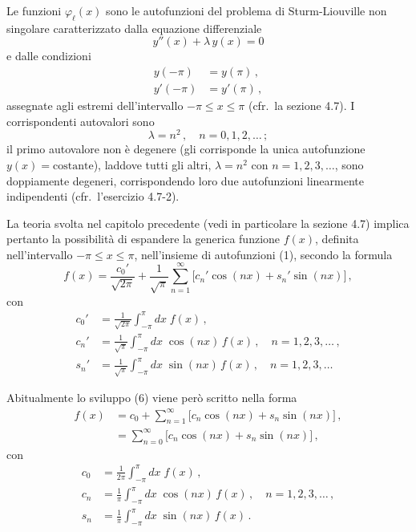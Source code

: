 \documentclass[11pt, a4paper]{book}
\numberwithin{equation}{section}
\begin{document}
Le funzioni $\varphi_\ell(x)$ sono le autofunzioni del problema di Sturm-Liouville non singolare caratterizzato dalla equazione differenziale
\begin{equation}
  y''(x) + \lambda\,y(x) = 0 \tag{3}
\end{equation}
e dalle condizioni
\begin{align}
  y(-\pi) &= y(\pi)\,, \tag{4a}\\
  y'(-\pi) &= y'(\pi)\,, \tag{4b}
\end{align}
assegnate agli estremi dell'intervallo $-\pi \leq x \leq \pi$ (cfr.\ la sezione 4.7). I corrispondenti autovalori sono
\begin{equation}
  \lambda = n^2\,,\quad n=0,1,2,\ldots\,; \tag{5}
\end{equation}
il primo autovalore non è degenere (gli corrisponde la unica autofunzione $y(x) = \text{costante}$), laddove tutti gli altri, $\lambda=n^2$ con $n=1,2,3,\ldots$, sono doppiamente degeneri, corrispondendo loro due autofunzioni linearmente indipendenti (cfr.\ l'esercizio 4.7-2).

La teoria svolta nel capitolo precedente (vedi in particolare la sezione 4.7) implica pertanto la possibilità di espandere la generica funzione $f(x)$, definita nell'intervallo $-\pi \leq x \leq \pi$, nell'insieme di autofunzioni (1), secondo la formula
\begin{equation}
  f(x) = \frac{c_0'}{\sqrt{2\pi}} + \frac{1}{\sqrt{\pi}}\sum_{n=1}^{\infty}
  \bigl[c_n'\cos(nx) + s_n'\sin(nx)\bigr]\,, \tag{6}
\end{equation}
con
\begin{align}
  c_0' &= \frac{1}{\sqrt{2\pi}}\int_{-\pi}^{\pi} dx\;f(x)\,, \tag{7a}\\
  c_n' &= \frac{1}{\sqrt{\pi}}\int_{-\pi}^{\pi} dx\;\cos(nx)\,f(x)\,,\quad n=1,2,3,\ldots\,, \tag{7b}\\
  s_n' &= \frac{1}{\sqrt{\pi}}\int_{-\pi}^{\pi} dx\;\sin(nx)\,f(x)\,,\quad n=1,2,3,\ldots \tag{7c}
\end{align}

Abitualmente lo sviluppo (6) viene però scritto nella forma
\begin{align}
  f(x) &= c_0 + \sum_{n=1}^{\infty}\bigl[c_n\cos(nx) + s_n\sin(nx)\bigr]\,, \tag{8a}\\
  &= \sum_{n=0}^{\infty}\bigl[c_n\cos(nx) + s_n\sin(nx)\bigr]\,, \tag{8b}
\end{align}
con
\begin{align}
  c_0 &= \frac{1}{2\pi}\int_{-\pi}^{\pi} dx\;f(x)\,, \tag{9a}\\
  c_n &= \frac{1}{\pi}\int_{-\pi}^{\pi} dx\;\cos(nx)\,f(x)\,,\quad n=1,2,3,\ldots\,, \tag{9b}\\
  s_n &= \frac{1}{\pi}\int_{-\pi}^{\pi} dx\;\sin(nx)\,f(x)\,. \tag{9c}
\end{align}
\end{document}
